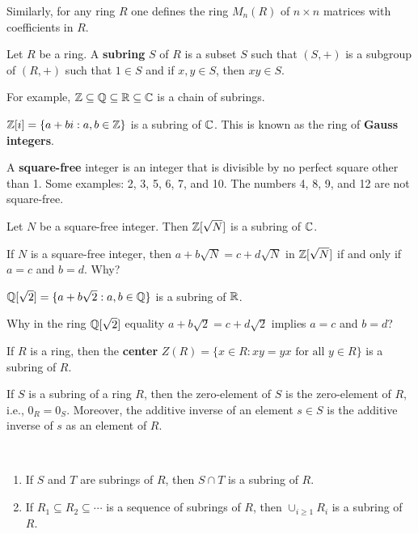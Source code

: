 Similarly, for any ring $R$ one defines the ring $M_n(R)$ of $n\times n$ matrices
with coefficients in $R$. 

\begin{definition}
    Let $R$ be a ring. A \textbf{subring} $S$ of $R$ is a subset $S$ such that
    $(S,+)$ is a subgroup of $(R,+)$ such that $1\in S$ and 
    if $x,y\in S$, then $xy\in S$. 
\end{definition}

For example, $\mathbb{Z}\subseteq\mathbb{Q}\subseteq\mathbb{R}\subseteq\mathbb{C}$ is a chain of subrings. 

\begin{example}
    $\mathbb{Z}[i]=\{a+bi:a,b\in\mathbb{Z}\}$ is a subring of $\mathbb{C}$. 
    This is known as the ring of \textbf{Gauss integers}.  
\end{example}

A \textbf{square-free} integer is an integer that is divisible by 
no perfect square other than 1. Some examples: 2, 3, 5, 6, 7, and 10. 
The numbers 4, 8, 9, and 12 are not square-free. 

\begin{example}
	Let $N$ be a square-free integer. Then $\mathbb{Z}[\sqrt{N}]$ is
	a subring of $\mathbb{C}$.  	
\end{example}

If $N$ is a square-free integer, then 
$a+b\sqrt{N}=c+d\sqrt{N}$ in $\mathbb{Z}[\sqrt{N}]$ 
if and only if $a=c$ and $b=d$. Why?

\begin{example}
    $\mathbb{Q}[\sqrt{2}]=\{a+b\sqrt{2}:a,b\in\mathbb{Q}\}$ is a subring of $\mathbb{R}$. 
\end{example}

Why in the ring $\mathbb{Q}[\sqrt{2}]$ 
equality $a+b\sqrt{2}=c+d\sqrt{2}$ implies $a=c$ and $b=d$?

\begin{example}
    If $R$ is a ring, then the \textbf{center} 
    $Z(R)=\{x\in R:xy=yx\text{ for all $y\in R$}\}$ 
    is a subring of $R$. 
\end{example}

If $S$ is a subring of a ring $R$, then the zero-element 
of $S$ is the zero-element of $R$, i.e., $0_R=0_S$. Moreover, 
the additive inverse of an element $s\in S$ 
is the additive inverse of $s$ as an element of $R$. 	

\begin{exercise}\
\begin{enumerate}
	\item If $S$ and $T$ are subrings of $R$, then $S\cap T$ is a subring of $R$.
	\item If $R_1\subseteq R_2\subseteq\cdots$ is a sequence of subrings of $R$, then 
	$\cup_{i\geq1}R_i$ is a subring of $R$. 
\end{enumerate}
\end{exercise}

